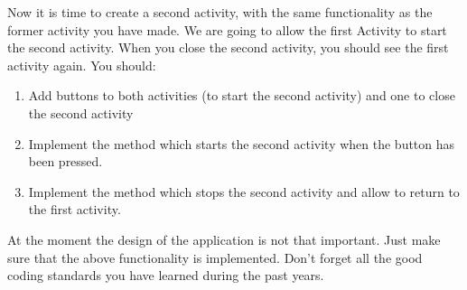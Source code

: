 \begin{exercise}
	Now it is time to create a second activity, with the same functionality as the former activity you have made. We are going to allow the first Activity to start the second activity. When you close the second activity, you should see the first activity again. You should:
	\begin{enumerate}
		\item Add buttons to both activities (to start the second activity) and one to close the second activity
		\item Implement the method which starts the second activity when the button has been pressed.
		\item Implement the method which stops the second activity and allow to return to the first activity.
	\end{enumerate}
\end{exercise}

At the moment the design of the application is not that important. Just make sure that the above functionality is implemented. Don't forget all the good coding standards you have learned during the past years.
